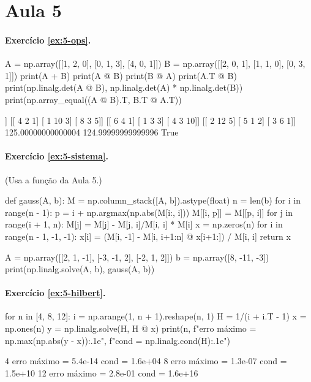 \section*{Aula 5}

\paragraph{Exercício \ref{ex:5-ops}.}
\begin{entrada}
A = np.array([[1, 2, 0], [0, 1, 3], [4, 0, 1]])
B = np.array([[2, 0, 1], [1, 1, 0], [0, 3, 1]])
print(A + B)
print(A @ B)
print(B @ A)
print(A.T @ B)
print(np.linalg.det(A @ B), np.linalg.det(A) * np.linalg.det(B))
print(np.array_equal((A @ B).T, B.T @ A.T))
\end{entrada}
\begin{saida}
[[3 2 1]
 [1 2 3]
 [4 3 2]]
[[ 4  2  1]
 [ 1 10  3]
 [ 8  3  5]]
[[ 6  4  1]
 [ 1  3  3]
 [ 4  3 10]]
[[ 2 12  5]
 [ 5  1  2]
 [ 3  6  1]]
125.00000000000004 124.99999999999996
True
\end{saida}

\paragraph{Exercício \ref{ex:5-sistema}.} (Usa a função  da Aula 5.)
\begin{entrada}
def gauss(A, b):
    M = np.column_stack([A, b]).astype(float)
    n = len(b)
    for i in range(n - 1):
        p = i + np.argmax(np.abs(M[i:, i]))
        M[[i, p]] = M[[p, i]]
        for j in range(i + 1, n):
            M[j] = M[j] - M[j, i]/M[i, i] * M[i]
    x = np.zeros(n)
    for i in range(n - 1, -1, -1):
        x[i] = (M[i, -1] - M[i, i+1:n] @ x[i+1:]) / M[i, i]
    return x

A = np.array([[2, 1, -1], [-3, -1, 2], [-2, 1, 2]])
b = np.array([8, -11, -3])
print(np.linalg.solve(A, b), gauss(A, b))
\end{entrada}
\begin{saida}
[ 2.  3. -1.] [ 2.  3. -1.]
\end{saida}

\paragraph{Exercício \ref{ex:5-hilbert}.}
\begin{entrada}
for n in [4, 8, 12]:
    i = np.arange(1, n + 1).reshape(n, 1)
    H = 1/(i + i.T - 1)
    x = np.ones(n)
    y = np.linalg.solve(H, H @ x)
    print(n, f"erro máximo = {np.max(np.abs(y - x)):.1e}", f"cond = {np.linalg.cond(H):.1e}")
\end{entrada}
\begin{saida}
4 erro máximo = 5.4e-14 cond = 1.6e+04
8 erro máximo = 1.3e-07 cond = 1.5e+10
12 erro máximo = 2.8e-01 cond = 1.6e+16
\end{saida}

